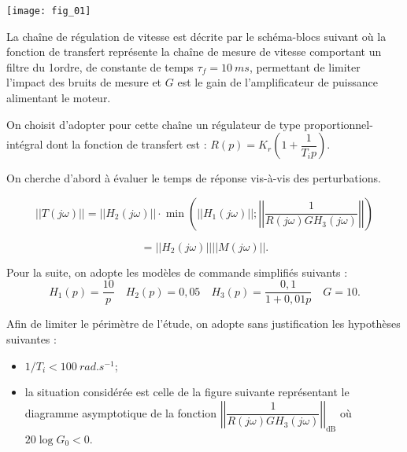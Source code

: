 \begin{marginfigure}
\texttt{[image: fig\_01]}
\end{marginfigure}

La chaîne de régulation de vitesse est décrite par le schéma-blocs suivant où la fonction de transfert représente la chaîne de mesure de vitesse comportant un filtre
du 1\ier ordre, de constante de temps $\tau_f = \SI{10}{ms}$, permettant de limiter
l’impact des bruits de mesure et $G$ est le gain de l’amplificateur de puissance
alimentant le moteur.

On choisit d’adopter pour cette chaîne un régulateur de type proportionnel-intégral
dont la fonction de transfert est : $R(p)=K_r\left(1+\dfrac{1}{T_i p}  \right)$.


On cherche d'abord à évaluer le temps de réponse vis-à-vis des perturbations. 


$$
|| T\left(j \omega\right) || = 
|| H_2\left(j \omega\right) || \cdot 
\min \left(
||H_1\left(j \omega\right)||; 
\left|\left| \dfrac{1}{R\left(j \omega\right)GH_3\left(j \omega\right)}\right|\right|\right)
$$

$$
= || H_2\left(j \omega\right) || || M\left(j \omega\right) ||.
$$


Pour la suite, on adopte les modèles de commande simplifiés suivants : 
$$
H_1(p)=\dfrac{10}{p} \quad
H_2(p)=0,05 \quad
H_3(p)=\dfrac{0,1}{1+0,01 p}\quad
G=10.
$$

Afin de limiter le périmètre de l’étude, on adopte sans justification les
hypothèses suivantes : 
\begin{itemize}
\item $1/T_i < \SI{100}{rad.s^{-1}}$;
\item la situation considérée est celle de la figure suivante représentant le diagramme asymptotique de la fonction 
$
\left|\left|\dfrac{1}{R\left(j \omega\right)GH_3\left(j \omega\right)}\right|\right|_{\text{dB}}
$ où $20\log G_0 < 0$.
\end{itemize}

